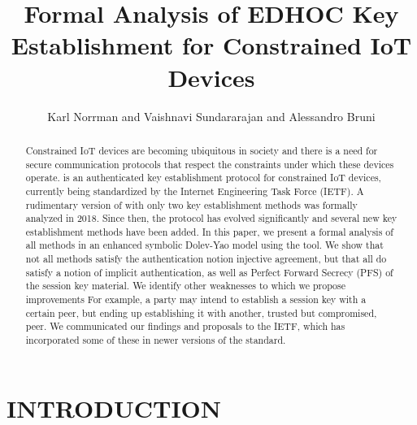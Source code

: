 \documentclass[runningheads]{llncs}
\title{Formal Analysis of EDHOC Key Establishment for Constrained IoT Devices}
\author{
        Karl Norrman and 
        Vaishnavi Sundararajan and
        Alessandro Bruni
}
\begin{document}
\maketitle
%
\begin{abstract}
Constrained IoT devices are becoming ubiquitous in society
and there is a need for secure communication protocols that respect the
constraints under which these devices operate.
%
\mEdhoc{} is an authenticated key establishment protocol for constrained IoT
devices, currently being standardized by the Internet Engineering Task
Force (IETF).
%
A rudimentary version of \mEdhoc{} with only two key establishment methods was
formally analyzed in 2018.
%
Since then, the protocol has evolved significantly and several new key
establishment methods have been added.
%
In this paper, we present a formal analysis of all \mEdhoc{} methods in an
enhanced symbolic Dolev-Yao model using the \mTamarin{} tool.
%
We show that not all methods satisfy the authentication notion
injective agreement, but that all do satisfy a notion of implicit
authentication, as well as Perfect Forward Secrecy (PFS) of the session key material.
%
We identify other weaknesses to which we propose improvements
%
For example, a party may intend to establish a session key with a certain peer,
but ending up establishing it with another, trusted but compromised, peer.
%
We communicated our findings and proposals to the IETF, which
has incorporated some of these in newer versions of the standard.
\end{abstract}
%
\section{\uppercase{Introduction}}
\label{sec:introduction}
\end{document}
